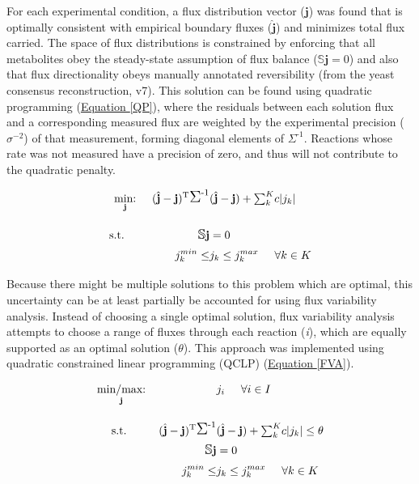 For each experimental condition, a flux distribution vector ($\mathbf{j}$) was found that is optimally consistent with empirical boundary fluxes ($\hat{\mathbf{j}}$) and minimizes total flux carried.  The space of flux distributions is constrained by enforcing that all metabolites obey the steady-state assumption of flux balance ($\mathbb{S}\mathbf{j} = 0$) and also that flux directionality obeys manually annotated reversibility (from the yeast consensus reconstruction, v7).  This solution can be found using quadratic programming (\hyperref[QP]{Equation \ref{QP}}), where the residuals between each solution flux and a corresponding measured flux are weighted by the experimental precision ($\sigma^{-2}$) of that measurement, forming diagonal elements of $\Sigma^{\text{-}1}$.  Reactions whose rate was not measured have a precision of zero, and thus will not contribute to the quadratic penalty.

\begin{align}
\underset{\mathbf{j}}{\text{min:}} \hspace{5mm} (\hat{\mathbf{j}} - \mathbf{j})^{\text{T}}\mathlarger{\mathlarger{\Sigma}}^{\text{-1}}&(\hat{\mathbf{j}} - \mathbf{j}) + \mathsmaller{\sum_{k}^{K}}c|j_{k}| \notag\\[1em]
\text{s.t.} \hspace{23mm} \mathlarger{\mathbb{S}}\mathbf{j} &= 0 \notag\\
\hspace{5mm} j_{k}^{min} \le &j_{k} \le j_{k}^{max} \hspace{5mm}\forall k \in K \label{QP}
\end{align}

Because there might be multiple solutions to this problem which are optimal, this uncertainty can be at least partially be accounted for using flux variability analysis.  Instead of choosing a single optimal solution, flux variability analysis \cite{Mahadevan:2003wq} attempts to choose a range of fluxes through each reaction (\textit{i}), which are equally supported as an optimal solution ($\theta$).  This approach was implemented using quadratic constrained linear programming (QCLP) (\hyperref[FVA]{Equation \ref{FVA}}).

\begin{align}
\underset{\mathbf{j}}{\text{min/max:}} \hspace{22mm} & j_{i}\hspace{5mm}\forall i \in I\notag\\[1em]
\text{s.t.} \hspace{10mm} (\hat{\mathbf{j}} - \mathbf{j})^{\text{T}}\mathlarger{\mathlarger{\Sigma}}^{\text{-1}}&(\hat{\mathbf{j}} - \mathbf{j}) + \mathsmaller{\sum_{k}^{K}}c|j_{k}| \le \theta \notag\\
\mathlarger{\mathbb{S}}\mathbf{j} &= 0 \notag\\
\hspace{5mm} j_{k}^{min} \le &j_{k} \le j_{k}^{max} \hspace{5mm}\forall k \in K \label{FVA}
\end{align}

